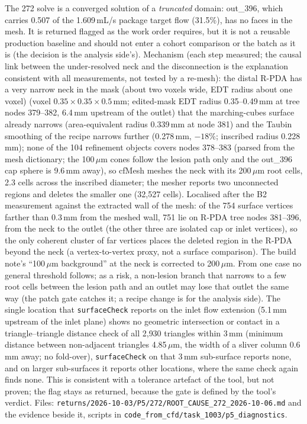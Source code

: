 \documentclass[11pt]{article}
\begin{document}
The 272 solve is a converged solution of a \emph{truncated} domain: out\_396, which carries 0.507 of the 1.609\,mL/s package target flow (31.5\%), has no faces in the mesh. It is returned flagged as the work order requires, but it is not a reusable production baseline and should not enter a cohort comparison or the batch as it is (the decision is the analysis side's). Mechanism (each step measured; the causal link between the under-resolved neck and the disconnection is the explanation consistent with all measurements, not tested by a re-mesh): the distal R-PDA has a very narrow neck in the mask (about two voxels wide, EDT radius about one voxel) (voxel $0.35\times0.35\times0.5$\,mm; edited-mask EDT radius 0.35--0.49\,mm at tree nodes 379--382, 6.4\,mm upstream of the outlet) that the marching-cubes surface already narrows (area-equivalent radius 0.339\,mm at node 381) and the Taubin smoothing of the recipe narrows further (0.278\,mm, $-18\%$; inscribed radius 0.228\,mm); none of the 104 refinement objects covers nodes 378--383 (parsed from the mesh dictionary; the 100\,$\mu$m cones follow the lesion path only and the out\_396 cap sphere is 9.6\,mm away), so cfMesh meshes the neck with its 200\,$\mu$m root cells, 2.3 cells across the inscribed diameter; the mesher reports two unconnected regions and deletes the smaller one (32{,}527 cells). Localised after the B2 measurement against the extracted wall of the mesh: of the 754 surface vertices farther than 0.3\,mm from the meshed wall, 751 lie on R-PDA tree nodes 381--396, from the neck to the outlet (the other three are isolated cap or inlet vertices), so the only coherent cluster of far vertices places the deleted region in the R-PDA beyond the neck (a vertex-to-vertex proxy, not a surface comparison). The build note's ``100\,$\mu$m background'' at the neck is corrected to 200\,$\mu$m. From one case no general threshold follows; as a risk, a non-lesion branch that narrows to a few root cells between the lesion path and an outlet may lose that outlet the same way (the patch gate catches it; a recipe change is for the analysis side). The single location that \texttt{surfaceCheck} reports on the inlet flow extension (5.1\,mm upstream of the inlet plane) shows no geometric intersection or contact in a triangle--triangle distance check of all 2{,}930 triangles within 3\,mm (minimum distance between non-adjacent triangles 4.85\,$\mu$m, the width of a sliver column 0.6\,mm away; no fold-over), \texttt{surfaceCheck} on that 3\,mm sub-surface reports none, and on larger sub-surfaces it reports other locations, where the same check again finds none. This is consistent with a tolerance artefact of the tool, but not proven; the flag stays as returned, because the gate is defined by the tool's verdict. Files: \texttt{returns/2026-10-03/P5/272/ROOT\_CAUSE\_272\_2026-10-06.md} and the evidence beside it, scripts in \texttt{code\_\allowbreak{}from\_\allowbreak{}cfd/\allowbreak{}task\_\allowbreak{}1003/\allowbreak{}p5\_\allowbreak{}diagnostics}.
\end{document}
